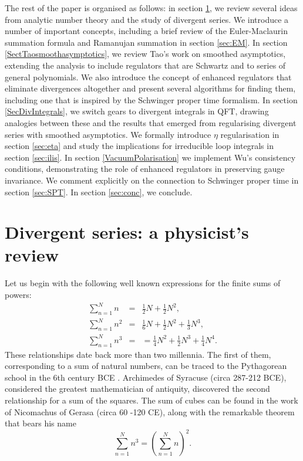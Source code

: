 \documentclass[11pt, letter]{article}
\begin{document}
The rest of the paper is organised as follows: in section \ref{sec:seriesrev}, we review several ideas from analytic number theory and the study of divergent series. We introduce a number of important concepts, including a brief review of the Euler-Maclaurin summation formula and Ramanujan summation in section \ref{sec:EM}. In section \ref{SectTaosmoothasymptotics}, we review Tao's work on smoothed asymptotics, extending the analysis to include regulators that are Schwartz and to series of general polynomials. We also introduce the concept of enhanced regulators that eliminate divergences altogether and present several algorithms for finding them, including one that is inspired by the Schwinger proper time formalism. In section \ref{SecDivIntegrals}, we switch gears to divergent integrals in QFT, drawing analogies between these and the results that emerged from regularising divergent series with smoothed asymptotics. We formally introduce $\eta$ regularisation in section \ref{sec:eta} and study the implications for irreducible loop integrals in section \ref{sec:ilis}.  In section \ref{VacuumPolarisation} we implement Wu's consistency conditions, demonstrating the role of enhanced regulators in preserving gauge invariance. We comment explicitly on the    connection to Schwinger proper time in section \ref{sec:SPT}. In section \ref{sec:conc}, we conclude.  



\section{Divergent series: a physicist's review} \label{sec:seriesrev}

Let us begin with the following well known expressions for the finite sums of powers:
\begin{eqnarray}\label{Powersum_s1}
\sum_{n=1}^N n & =&  \frac{1}{2}N + \frac{1}{2}N^2,
\\
\sum_{n=1}^N n^2 & =& \frac{1}{6} N + \frac{1}{2}N^2 + \frac{1}{3}N^3, \label{Powersum_s2}
\\
\sum_{n=1}^N n^3  &=&  = \frac{1}{4}N^2 + \frac{1}{2}N^3 + \frac{1}{4}N^4. \label{Powersum_s3}
\end{eqnarray}
These relationships date back more than two millennia. The first of them, corresponding to a sum of natural numbers, can be traced to the Pythagorean school in the 6th century BCE  \citep{Peng02a, Sant17}. Archimedes of Syracuse (circa 287-212 BCE), considered the greatest mathematician of antiquity, discovered the second relationship for a sum of the squares. The sum of cubes can be found in the work of Nicomachus of Gerasa (circa 60 -120 CE),  along with the remarkable theorem that bears his name $$\sum \limits_{n=1}^{N} n^3 = \left(\sum \limits_{n=1}^{N} n\right)^2.$$
\end{document}
